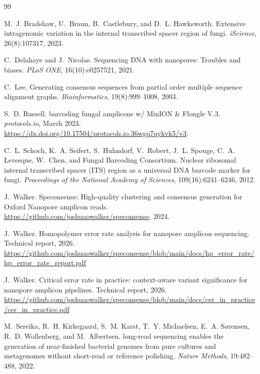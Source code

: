 \documentclass[11pt]{article}
\begin{document}
\begin{thebibliography}{99}

M.~J. Bradshaw, U.~Braun, B.~Castlebury, and D.~L. Hawksworth.
\newblock Extensive intragenomic variation in the internal transcribed spacer
region of fungi.
\newblock \emph{iScience}, 26(8):107317, 2023.

C.~Delahaye and J.~Nicolas.
\newblock Sequencing {DNA} with nanopores: Troubles and biases.
\newblock \emph{PLoS ONE}, 16(10):e0257521, 2021.

C.~Lee.
\newblock Generating consensus sequences from partial order multiple sequence
alignment graphs.
\newblock \emph{Bioinformatics}, 19(8):999--1008, 2003.

S.~D. Russell.
 barcoding fungal amplicons w/ {MinION \& Flongle V.3}.
\newblock \emph{protocols.io}, March 2023.
\newblock \url{https://dx.doi.org/10.17504/protocols.io.36wgq7qykvk5/v3}.

C.~L. Schoch, K.~A. Seifert, S.~Huhndorf, V.~Robert, J.~L. Spouge, C.~A.
Levesque, W.~Chen, and Fungal Barcoding Consortium.
\newblock Nuclear ribosomal internal transcribed spacer ({ITS}) region as a
universal {DNA} barcode marker for fungi.
\newblock \emph{Proceedings of the National Academy of Sciences},
109(16):6241--6246, 2012.

J.~Walker.
\newblock Speconsense: High-quality clustering and consensus generation for
{Oxford Nanopore} amplicon reads.
\newblock \url{https://github.com/joshuaowalker/speconsense}, 2024.

J.~Walker.
\newblock Homopolymer error rate analysis for nanopore amplicon sequencing.
\newblock Technical report, 2026.
\newblock \url{https://github.com/joshuaowalker/speconsense/blob/main/docs/hp_error_rate/hp_error_rate_report.pdf}

J.~Walker.
\newblock Critical error rate in practice: context-aware variant significance
for nanopore amplicon pipelines.
\newblock Technical report, 2026.
\newblock \url{https://github.com/joshuaowalker/speconsense/blob/main/docs/cer_in_practice/cer_in_practice.pdf}

M.~Sereika, R.~H. Kirkegaard, S.~M. Karst, T.~Y. Michaelsen, E.~A.
S{\o}rensen, R.~D. Wollenberg, and M.~Albertsen.
 long-read sequencing enables the generation of
near-finished bacterial genomes from pure cultures and metagenomes without
short-read or reference polishing.
\newblock \emph{Nature Methods}, 19:482--488, 2022.


\end{thebibliography}
\end{document}

